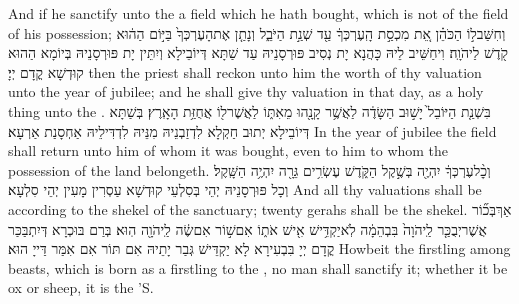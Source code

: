 {And if he sanctify unto the \lord\space a field which he hath bought, which is not of the field of his possession;}{}
{וְחִשַּׁב\maqqaf ל֣וֹ הַכֹּהֵ֗ן אֵ֚ת מִכְסַ֣ת הָֽעֶרְכְּךָ֔ עַ֖ד שְׁנַ֣ת הַיֹּבֵ֑ל וְנָתַ֤ן אֶת\maqqaf הָעֶרְכְּךָ֙ בַּיּ֣וֹם הַה֔וּא קֹ֖דֶשׁ לַיהֹוָֽה׃}
{וִיחַשֵּׁיב לֵיהּ כָּהֲנָא יָת נְסִיב פּוּרְסָנֵיהּ עַד שַׁתָּא דְּיוֹבֵילָא וְיִתֵּין יָת פּוּרְסָנֵיהּ בְּיוֹמָא הַהוּא קוּדְשָׁא קֳדָם יְיָ׃}
{then the priest shall reckon unto him the worth of thy valuation unto the year of jubilee; and he shall give thy valuation in that day, as a holy thing unto the \lord.}{}
{בִּשְׁנַ֤ת הַיּוֹבֵל֙ יָשׁ֣וּב הַשָּׂדֶ֔ה לַאֲשֶׁ֥ר קָנָ֖הוּ מֵאִתּ֑וֹ לַאֲשֶׁר\maqqaf ל֖וֹ אֲחֻזַּ֥ת הָאָֽרֶץ׃}
{בְּשַׁתָּא דְּיוֹבֵילָא יְתוּב חַקְלָא לִדְזַבְנֵיהּ מִנֵּיהּ לִדְדִּילֵיהּ אַחְסָנַת אַרְעָא׃}
{In the year of jubilee the field shall return unto him of whom it was bought, even to him to whom the possession of the land belongeth.}{}
{וְכׇ֨ל\maqqaf עֶרְכְּךָ֔ יִהְיֶ֖ה בְּשֶׁ֣קֶל הַקֹּ֑דֶשׁ עֶשְׂרִ֥ים גֵּרָ֖ה יִהְיֶ֥ה הַשָּֽׁקֶל׃}
{וְכָל פּוּרְסָנֵיהּ יְהֵי בְּסִלְעֵי קוּדְשָׁא עַסְרִין מָעִין יְהֵי סִלְעָא׃}
{And all thy valuations shall be according to the shekel of the sanctuary; twenty gerahs shall be the shekel.}{}
{אַךְ\maqqaf בְּכ֞וֹר אֲשֶׁר\maqqaf יְבֻכַּ֤ר לַֽיהֹוָה֙ בִּבְהֵמָ֔ה לֹֽא\maqqaf יַקְדִּ֥ישׁ אִ֖ישׁ אֹת֑וֹ אִם\maqqaf שׁ֣וֹר אִם\maqqaf שֶׂ֔ה לַֽיהֹוָ֖ה הֽוּא׃}
{בְּרַם בּוּכְרָא דְּיִתְבַּכַּר קֳדָם יְיָ בִּבְעִירָא לָא יַקְדֵּישׁ גְּבַר יָתֵיהּ אִם תּוֹר אִם אִמַּר דַּייָ הוּא׃}
{Howbeit the firstling among beasts, which is born as a firstling to the \lord, no man shall sanctify it; whether it be ox or sheep, it is the \lord’S.}{}

